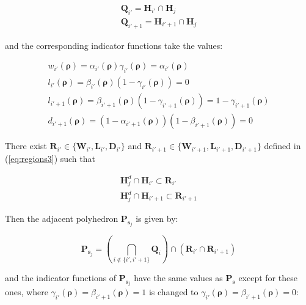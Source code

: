 \documentclass[11pt]{article}
\numberwithin{equation}{section}
\numberwithin{figure}{section}
\numberwithin{table}{section}
\begin{document}
\begin{equation}
\begin{array}{l}
\textbf{Q}_{i'}=\textbf{H}_{i'}\cap\textbf{H}_{j}\\
\textbf{Q}_{i'+1}=\textbf{H}_{i'+1}\cap\textbf{H}_{j}
\end{array}
\label{eq:modeSearch4}
\end{equation}

\noindent and the corresponding indicator functions take the values:

\begin{equation}
\begin{array}{l}
w_{i'}(\boldsymbol\rho)=\alpha_{i'}(\boldsymbol\rho)\gamma_{i'}(\boldsymbol\rho)=\alpha_{i'}(\boldsymbol\rho)\\
l_{i'}(\boldsymbol\rho)=\beta_{i'}(\boldsymbol\rho)(1-\gamma_{i'}(\boldsymbol\rho))=0\\
l_{i'+1}(\boldsymbol\rho)=\beta_{i'+1}(\boldsymbol\rho)(1-\gamma_{i'+1}(\boldsymbol\rho))=1-\gamma_{i'+1}(\boldsymbol\rho)\\
d_{i'+1}(\boldsymbol\rho)=(1-\alpha_{i'+1}(\boldsymbol\rho))(1-\beta_{i'+1}(\boldsymbol\rho))=0
\end{array}
\label{eq:modeSearch5}
\end{equation}

\noindent There exist $\textbf{R}_{i'} \in \{\textbf{W}_{i'}, \textbf{L}_{i'}, \textbf{D}_{i'}\}$ and $\textbf{R}_{i'+1} \in \{\textbf{W}_{i'+1}, \textbf{L}_{i'+1}, \textbf{D}_{i'+1}\}$ defined in (\ref{eq:regions3}) such that

\begin{equation}
\begin{array}{l}
\textbf{H}^{d}_{j}\cap \textbf{H}_{i'}\subset \textbf{R}_{i'}\\
\textbf{H}^{d}_{j}\cap \textbf{H}_{i'+1}\subset \textbf{R}_{i'+1}
\end{array}
\label{eq:modeSearch6}
\end{equation}

\noindent Then the adjacent polyhedron $\textbf{P}_{\boldsymbol s_{j}}$ is given by:

\begin{equation}
\textbf{P}_{\boldsymbol s_{j}}=(\bigcap_{i\notin\{i', i'+1\}} \textbf{Q}_{i})\cap (\textbf{R}_{i'}\cap\textbf{R}_{i'+1})
\label{eq:modeSearch7}
\end{equation}

\noindent and the indicator functions of $\textbf{P}_{\boldsymbol s_{j}}$ have the same values as $\textbf{P}_{\boldsymbol s}$ except for these ones, where $\gamma_{i'}(\boldsymbol\rho)=\beta_{i'+1}(\boldsymbol\rho)=1$ is changed to $\gamma_{i'}(\boldsymbol\rho)=\beta_{i'+1}(\boldsymbol\rho)=0$:
\end{document}
